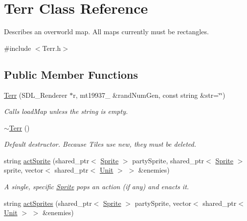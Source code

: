 \hypertarget{class_terr}{}\section{Terr Class Reference}
\label{class_terr}


Describes an overworld map. All maps currently must be rectangles.  




{\ttfamily \#include $<$Terr.\+h$>$}

\subsection*{Public Member Functions}
\begin{DoxyCompactItemize}
\item 
\hyperlink{class_terr_aeb479e13cfe1229f76b74c182b9186ed}{Terr} (S\+D\+L\+\_\+\+Renderer $\ast$r, mt19937\+\_ \&rand\+Num\+Gen, const string \&str=\char`\"{}\char`\"{})\hypertarget{class_terr_aeb479e13cfe1229f76b74c182b9186ed}{}\label{class_terr_aeb479e13cfe1229f76b74c182b9186ed}

\begin{DoxyCompactList}\small\item\em Calls load\+Map unless the string is empty. \end{DoxyCompactList}\item 
\hyperlink{class_terr_a8b68000bbfdc821e364bdb89f4465c17}{$\sim$\+Terr} ()\hypertarget{class_terr_a8b68000bbfdc821e364bdb89f4465c17}{}\label{class_terr_a8b68000bbfdc821e364bdb89f4465c17}

\begin{DoxyCompactList}\small\item\em Default destructor. Because Tiles use new, they must be deleted. \end{DoxyCompactList}\item 
string \hyperlink{class_terr_a7b6dedccfc7e19d9d77f4e986c52812b}{act\+Sprite} (shared\+\_\+ptr$<$ \hyperlink{class_sprite}{Sprite} $>$ party\+Sprite, shared\+\_\+ptr$<$ \hyperlink{class_sprite}{Sprite} $>$ sprite, vector$<$ shared\+\_\+ptr$<$ \hyperlink{class_unit}{Unit} $>$ $>$ \&enemies)\hypertarget{class_terr_a7b6dedccfc7e19d9d77f4e986c52812b}{}\label{class_terr_a7b6dedccfc7e19d9d77f4e986c52812b}

\begin{DoxyCompactList}\small\item\em A single, specific \hyperlink{class_sprite}{Sprite} pops an action (if any) and enacts it. \end{DoxyCompactList}\item 
string \hyperlink{class_terr_adc8910783511bda341ee07d2603823d4}{act\+Sprites} (shared\+\_\+ptr$<$ \hyperlink{class_sprite}{Sprite} $>$ party\+Sprite, vector$<$ shared\+\_\+ptr$<$ \hyperlink{class_unit}{Unit} $>$ $>$ \&enemies)\hypertarget{class_terr_adc8910783511bda341ee07d2603823d4}{}\label{class_terr_adc8910783511bda341ee07d2603823d4}


\end{DoxyCompactItemize}
